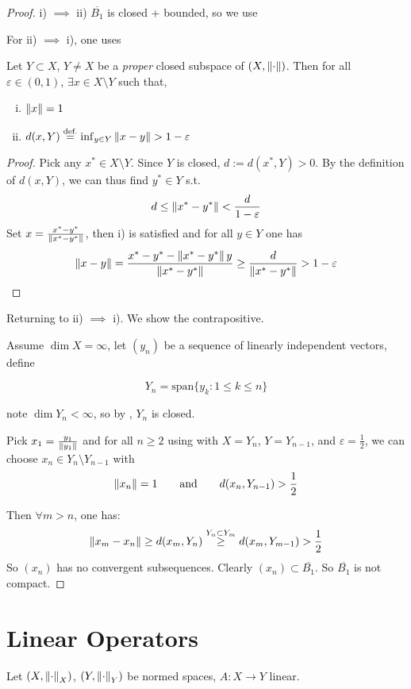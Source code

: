 \documentclass{article}
\begin{document}
\begin{proof}
    i) $\implies$ ii) $\overline{B_1}$ is closed + bounded, so we use   
    
    For ii) $\implies$ i), one uses  
\begin{lemma}[Riesz]\nextline
\label{riesz unit ball lemma}
    Let $Y \subset X$, $Y\neq X$ be a \textit{proper} closed subspace of $(X, \left\|{\cdot}\right\|)$. Then for all $\varepsilon \in (0,1)$, $\exists x \in X\setminus Y$ such that,  
    \begin{enumerate}[i)]
        \item $\left\|{x}\right\|=1$
        \item $d(x, Y) \overset{\text{def.}}{=} \inf_{y\in Y} \left\|{x-y}\right\| > 1- \varepsilon$
    \end{enumerate}
\end{lemma}  
\begin{proof}
    Pick any $x^* \in X\setminus Y$. Since $Y$ is closed, $d:=d(x^*, Y)>0$.  
    By the definition of $d(x,Y)$, we can thus find $y^* \in Y$ s.t.  
    $$
    d \leq \left\|{x^*-y^*}\right\| < \frac{d}{1-\varepsilon}
    $$  
    Set $x = \frac{x^*-y^*}{\left\|{x^*-y^*}\right\|}$, then i) is satisfied and for all $y\in Y$ one has  
    $$
    \left\|{x-y}\right\| = \frac{x^*-y^*-\left\|{x^*-y^*}\right\|y}{\left\|{x^*-y^*}\right\|} \geq \frac{d}{\left\|{x^*-y^*}\right\|} > 1-\varepsilon
    $$
\end{proof}

Returning to  ii) $\implies$ i). We show the contrapositive. 

Assume $\dim X=\infty$, let $(y_n)$ be a sequence of linearly independent vectors, define

$$Y_n = \text{span} \{y_k: 1\leq k\leq n\} $$

note $\dim Y_n < \infty$, so by , $Y_n$ is closed.  

Pick $x_1 = \frac{y_1}{\left\|{y_1}\right\|}$ and for all $n \geq 2$ using  with $X=Y_n$, $Y=Y_{n-1}$, and $\varepsilon=\frac{1}{2}$, we can choose $x_n \in Y_n \setminus Y_{n-1}$ with 
$$\left\|{x_n}\right\|=1 \qquad \text{and} \qquad d(x_n, Y_{n-1})>\frac{1}{2}$$

Then $\forall m > n$, one has:  
$$
\left\|{x_m-x_n}\right\| \geq d(x_m, Y_n) \overset{Y_n \subset Y_m}{\geq} d(x_m, Y_{m-1}) > \frac{1}{2}
$$  
So $(x_n)$ has no convergent subsequences. Clearly $(x_n) \subset \overline{B_1} $. So $\overline{B_1} $ is not compact.  
\end{proof}

\section{Linear Operators}  
Let $(X, \left\|{\cdot}\right\|_X)$, $(Y, \left\|{\cdot}\right\|_Y)$ be normed spaces, $A: X \to Y$ linear.  
\end{document}
